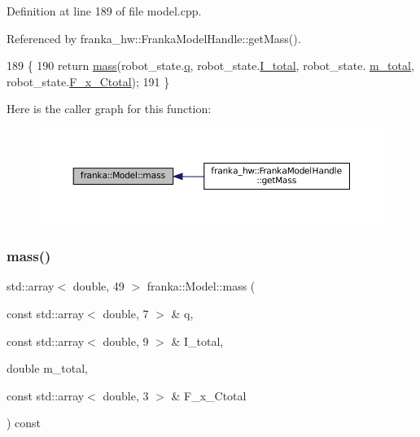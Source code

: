 Definition at line 189 of file model.\+cpp.



Referenced by franka\+\_\+hw\+::\+Franka\+Model\+Handle\+::get\+Mass().


\begin{DoxyCode}
189                                                                                          \{
190   \textcolor{keywordflow}{return} \hyperlink{classfranka_1_1Model_a39eefe959a2a9155b4782b98ad766530}{mass}(robot\_state.\hyperlink{structfranka_1_1RobotState_ade3335d1ac2f6c44741a916d565f7091}{q}, robot\_state.\hyperlink{structfranka_1_1RobotState_ad9120ae7b7613e77df8c1c3eba8fb033}{I\_total}, robot\_state.
      \hyperlink{structfranka_1_1RobotState_a87880d4693c8f576ebdabf00f4d4f981}{m\_total}, robot\_state.\hyperlink{structfranka_1_1RobotState_a72ee7362018e3c9e95e3c41e857bfd8d}{F\_x\_Ctotal});
191 \}
\end{DoxyCode}
Here is the caller graph for this function\+:
\nopagebreak
\begin{figure}[H]
\begin{center}
\leavevmode
\includegraphics[width=350pt]{classfranka_1_1Model_a39eefe959a2a9155b4782b98ad766530_icgraph}
\end{center}
\end{figure}
\mbox{\label{classfranka_1_1Model_a8ad5a8fcf29a3112c10664b644d2151a}} 
\subsubsection{\texorpdfstring{mass()}{mass()}\hspace{0.1cm}{\footnotesize\ttfamily [2/2]}}
{\footnotesize\ttfamily std\+::array$<$ double, 49 $>$ franka\+::\+Model\+::mass (\begin{DoxyParamCaption}\item[{const std\+::array$<$ double, 7 $>$ \&}]{q,  }\item[{const std\+::array$<$ double, 9 $>$ \&}]{I\+\_\+total,  }\item[{double}]{m\+\_\+total,  }\item[{const std\+::array$<$ double, 3 $>$ \&}]{F\+\_\+x\+\_\+\+Ctotal }\end{DoxyParamCaption}) const\hspace{0.3cm}{\ttfamily [noexcept]}}

